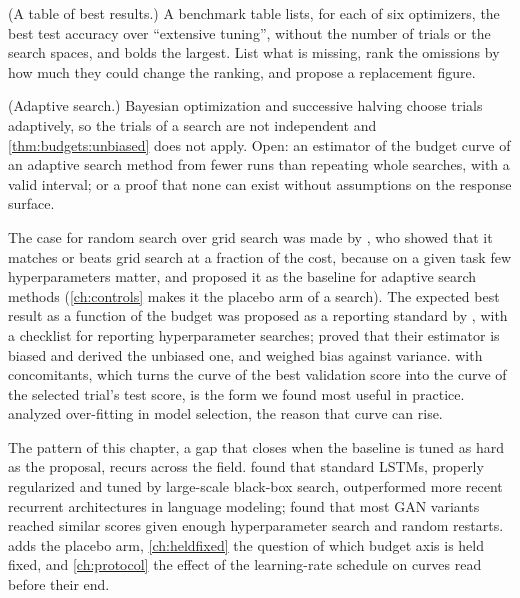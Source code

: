 \begin{refsection}
\begin{exercises}
\item \critique (A table of best results.) A benchmark table lists, for each of six optimizers, the best test accuracy over \enquote{extensive tuning}, without the number of trials or the search spaces, and bolds the largest. List what is missing, rank the omissions by how much they could change the ranking, and propose a replacement figure.\label{ex:budgets:table}

\item \research (Adaptive search.)\label{ex:budgets:adaptive} Bayesian optimization and successive halving choose trials adaptively, so the trials of a search are not independent and \cref{thm:budgets:unbiased} does not apply. Open: an estimator of the budget curve of an adaptive search method from fewer runs than repeating whole searches, with a valid interval; or a proof that none can exist without assumptions on the response surface.
\end{exercises}

\notesandrefs
The case for random search over grid search was made by \textcite{BergstraBengio2012}, who showed that it matches or beats grid search at a fraction of the cost, because on a given task few hyperparameters matter, and proposed it as the baseline for adaptive search methods (\cref{ch:controls} makes it the placebo arm of a search). The expected best result as a function of the budget was proposed as a reporting standard by \textcite{DodgeEtAl2019}, with a checklist for reporting hyperparameter searches; \textcite{TangEtAl2020} proved that their estimator is biased and derived the unbiased one, and \textcite{DodgeEtAl2021} weighed bias against variance.  with concomitants, which turns the curve of the best validation score into the curve of the selected trial's test score, is the form we found most useful in practice. \Textcite{CawleyTalbot2010} analyzed over-fitting in model selection, the reason that curve can rise.

The pattern of this chapter, a gap that closes when the baseline is tuned as hard as the proposal, recurs across the field. \Textcite{MelisEtAl2018} found that standard LSTMs, properly regularized and tuned by large-scale black-box search, outperformed more recent recurrent architectures in language modeling; \textcite{LucicEtAl2018} found that most GAN variants reached similar scores given enough hyperparameter search and random restarts.  adds the placebo arm, \cref{ch:heldfixed} the question of which budget axis is held fixed, and \cref{ch:protocol} the effect of the learning-rate schedule on curves read before their end.


\end{refsection}
